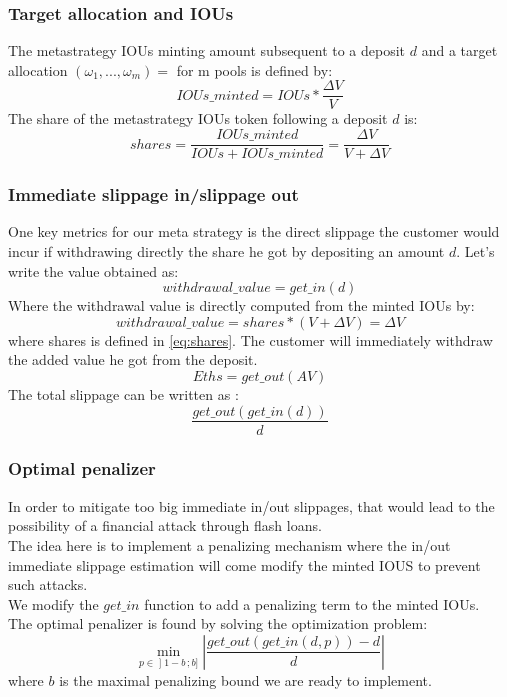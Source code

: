 \documentclass[conference]{IEEEtran}
\begin{document}
\subsubsection{Target allocation and IOUs}
The metastrategy IOUs minting amount subsequent to a deposit $d$ and a target allocation $(\omega_1,...,\omega_m) = $ for m pools is defined by:
\begin{equation}
IOUs\_minted = IOUs*\frac{\Delta V}{V}
\end{equation}
The share of the metastrategy IOUs token following a deposit $d$ is:
\begin{equation}\label{eq:shares}
shares = \frac{IOUs\_minted}{IOUs + IOUs\_minted} = \frac{\Delta V}{V+\Delta V}
\end{equation}

\subsubsection{Immediate slippage in/slippage out}
One key metrics for our meta strategy is the direct slippage the customer would incur if withdrawing directly the share he got by depositing an amount $d$.
Let's write the value obtained as:
\begin{equation}
withdrawal\_value = get\_in(d)
\end{equation}
Where the withdrawal value is directly computed from the minted IOUs by:
\begin{equation}
withdrawal\_value = shares * (V+\Delta V) = \Delta V
\end{equation}
where shares is defined in \ref{eq:shares}.
The customer will immediately withdraw the added value he got from the deposit.\\
\begin{equation}
Eths = get\_out(AV)
\end{equation}
The total slippage can be written as :
\begin{equation}
\frac{get\_out(get\_in(d))}{d} 
\end{equation}

\subsubsection{Optimal penalizer}
In order to mitigate too big immediate in/out slippages, that would lead to the possibility of a financial attack through flash loans.\\
The idea here is to implement a penalizing mechanism where the in/out immediate slippage estimation will come modify the minted IOUS to prevent such attacks.\\
We modify the $get\_in$ function to add a penalizing term to the minted IOUs.\\
The optimal penalizer is found by solving the optimization problem:
\begin{equation}\label{eq:optimalPenalizer}
\min_{p \in \mathopen{]}1-b\,;b\mathclose{]}} \left\lvert \frac{get\_out(get\_in(d,p))-d}{d} \right\rvert
\end{equation}
where $b$ is the maximal penalizing bound we are ready to implement.\\
\end{document}
